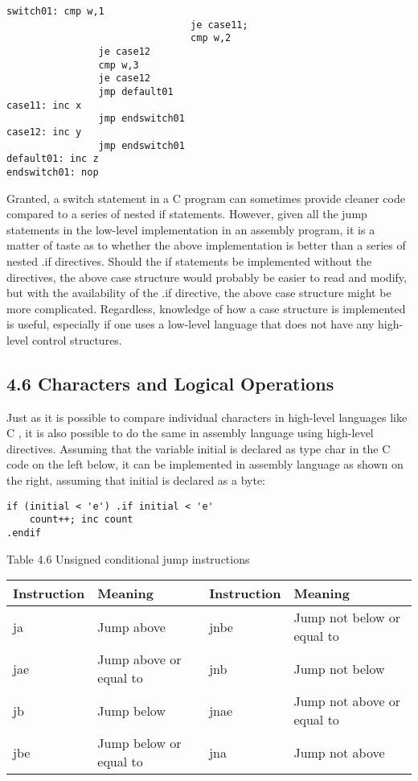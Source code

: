 \documentclass[10pt]{article}
\begin{document}
\begin{verbatim}
switch01: cmp w,1
                                je case11;
                                cmp w,2
                je case12
                cmp w,3
                je case12
                jmp default01
case11: inc x
                jmp endswitch01
case12: inc y
                jmp endswitch01
default01: inc z
endswitch01: nop
\end{verbatim}

Granted, a switch statement in a C program can sometimes provide cleaner code compared to a series of nested if statements. However, given all the jump statements in the low-level implementation in an assembly program, it is a matter of taste as to whether the above implementation is better than a series of nested .if directives. Should the if statements be implemented without the directives, the above case structure would probably be easier to read and modify, but with the availability of the .if directive, the above case structure might be more complicated. Regardless, knowledge of how a case structure is implemented is useful, especially if one uses a low-level language that does not have any high-level control structures.

\subsection*{4.6 Characters and Logical Operations}
Just as it is possible to compare individual characters in high-level languages like C , it is also possible to do the same in assembly language using high-level directives. Assuming that the variable initial is declared as type char in the C code on the left below, it can be implemented in assembly language as shown on the right, assuming that initial is declared as a byte:

\begin{verbatim}
if (initial < 'e') .if initial < 'e'
    count++; inc count
.endif
\end{verbatim}

Table 4.6 Unsigned conditional jump instructions

\begin{center}
\begin{tabular}{|l|l|l|l|}
\hline
Instruction & Meaning & Instruction & Meaning \\
\hline
ja & Jump above & jnbe & Jump not below or equal to \\
\hline
jae & Jump above or equal to & jnb & Jump not below \\
\hline
jb & Jump below & jnae & Jump not above or equal to \\
\hline
jbe & Jump below or equal to & jna & Jump not above \\
\hline
\end{tabular}
\end{center}
\end{document}
